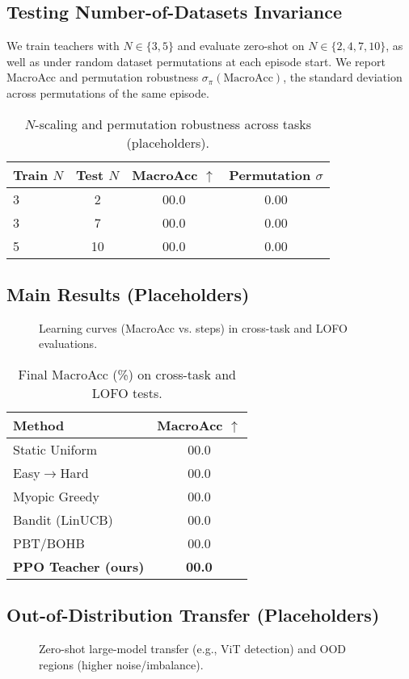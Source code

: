 \documentclass[11pt]{article}
\newcommand{\MacroAcc}{\mathrm{MacroAcc}}
\newcommand{\1}{\mathbf{1}}
\begin{document}
\subsection{Testing Number-of-Datasets Invariance}
We train teachers with $N\in\{3,5\}$ and evaluate zero-shot on $N\in\{2,4,7,10\}$, as well as under random dataset permutations at each episode start.
We report MacroAcc and permutation robustness $\sigma_\pi(\MacroAcc)$, the standard deviation across permutations of the same episode.
\begin{table}[H]
\centering
\caption{$N$-scaling and permutation robustness across tasks (placeholders).}
\label{tab:ninvariance}
\begin{tabular}{lccc}
\toprule
Train $N$ & Test $N$ & MacroAcc $\uparrow$ & Permutation $\sigma$ \\
\midrule
3 & 2 & 00.0 & 0.00 \\
3 & 7 & 00.0 & 0.00 \\
5 & 10 & 00.0 & 0.00 \\
\bottomrule
\end{tabular}
\end{table}

\subsection{Main Results (Placeholders)}
\begin{figure}[H]
  \centering
  \fbox{\rule{0pt}{2in}\rule{0.95\linewidth}{0pt}}
  \caption{Learning curves (MacroAcc vs. steps) in cross-task and LOFO evaluations.}
  \label{fig:indist}
\end{figure}

\begin{table}[H]
\centering
\caption{Final MacroAcc (\%) on cross-task and LOFO tests.}
\label{tab:indist}
\begin{tabular}{lc}
\toprule
Method & MacroAcc $\uparrow$ \\
\midrule
Static Uniform & 00.0 \\
Easy$\to$Hard & 00.0 \\
Myopic Greedy & 00.0 \\
Bandit (LinUCB) & 00.0 \\
PBT/BOHB & 00.0 \\
\textbf{PPO Teacher (ours)} & \textbf{00.0} \\
\bottomrule
\end{tabular}
\end{table}

\subsection{Out-of-Distribution Transfer (Placeholders)}
\begin{figure}[H]
  \centering
  \fbox{\rule{0pt}{2in}\rule{0.95\linewidth}{0pt}}
  \caption{Zero-shot large-model transfer (e.g., ViT detection) and OOD regions (higher noise/imbalance).}
  \label{fig:ood}
\end{figure}
\end{document}
